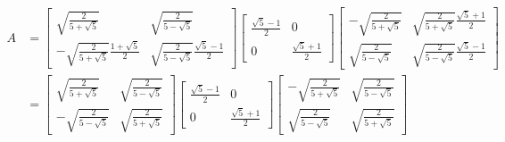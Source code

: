 \documentclass[12pt, a4paper, oneside]{article}
\begin{document}
        $$
            \begin{aligned}
                A&=\begin{bmatrix}
                    \sqrt{\frac{2}{5+\sqrt{5}}} & \sqrt{\frac{2}{5-\sqrt{5}}}\\
                    -\sqrt{\frac{2}{5+\sqrt{5}}}\frac{1+\sqrt{5}}{2} & \sqrt{\frac{2}{5-\sqrt{5}}}\frac{\sqrt{5}-1}{2}
                \end{bmatrix}\begin{bmatrix}
                    \frac{\sqrt{5} - 1}{2} & 0\\
                    0 & \frac{\sqrt{5} + 1}{2}
                \end{bmatrix}\begin{bmatrix}
                    -\sqrt{\frac{2}{5+\sqrt{5}}} & \sqrt{\frac{2}{5+\sqrt{5}}}\frac{\sqrt{5}+1}{2}\\
                    \sqrt{\frac{2}{5-\sqrt{5}}} & \sqrt{\frac{2}{5-\sqrt{5}}}\frac{\sqrt{5}-1}{2}
                \end{bmatrix}\\&=\begin{bmatrix}
                    \sqrt{\frac{2}{5+\sqrt{5}}} & \sqrt{\frac{2}{5-\sqrt{5}}}\\
                    -\sqrt{\frac{2}{5-\sqrt{5}}} & \sqrt{\frac{2}{5+\sqrt{5}}}
                \end{bmatrix}\begin{bmatrix}
                    \frac{\sqrt{5} - 1}{2} & 0\\
                    0 & \frac{\sqrt{5} + 1}{2}
                \end{bmatrix}\begin{bmatrix}
                    -\sqrt{\frac{2}{5+\sqrt{5}}} & \sqrt{\frac{2}{5-\sqrt{5}}}\\
                    \sqrt{\frac{2}{5-\sqrt{5}}} & \sqrt{\frac{2}{5+\sqrt{5}}}
                \end{bmatrix}
            \end{aligned}
        $$
\end{document}
